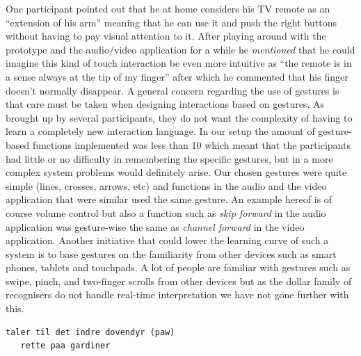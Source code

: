 One participant pointed out that he at home considers his TV remote as an ``extension of his arm'' meaning that he can use it and push the right buttons without having to pay visual attention to it. 
After playing around with the prototype and the audio/video application for a while he \emph{mentioned} that he could imagine this kind of touch interaction be even more intuitive as ``the remote is in a sense always at the tip of my finger'' after which he commented that his finger doesn't normally disappear.
\blank
A general concern regarding the use of gestures is that care must be taken when designing interactions based on gestures.
As brought up by several participants, they do not want the complexity of having to learn a completely new interaction language.
In our setup the amount of gesture-based functions implemented was less than 10 which meant that the participants had little or no difficulty in remembering the specific gestures, but in a more complex system problems would definitely arise.
Our chosen gestures were quite simple (lines, crosses, arrows, etc) and functions in the audio and the video application that were similar used the same gesture.
An example hereof is of course volume control but also a function such as \emph{skip forward} in the audio application was gesture-wise the same as \emph{channel forward} in the video application.
Another initiative that could lower the learning curve of such a system is to base gestures on the familiarity from other devices such as smart phones, tablets and touchpads.
A lot of people are familiar with gestures such as swipe, pinch, and two-finger scrolls from other devices but as the dollar family of recognisers do not handle real-time interpretation we have not gone further with this.


\todo{\dots}
\blank
\begin{verbatim}
taler til det indre dovendyr (paw)
   rette paa gardiner
\end{verbatim}

